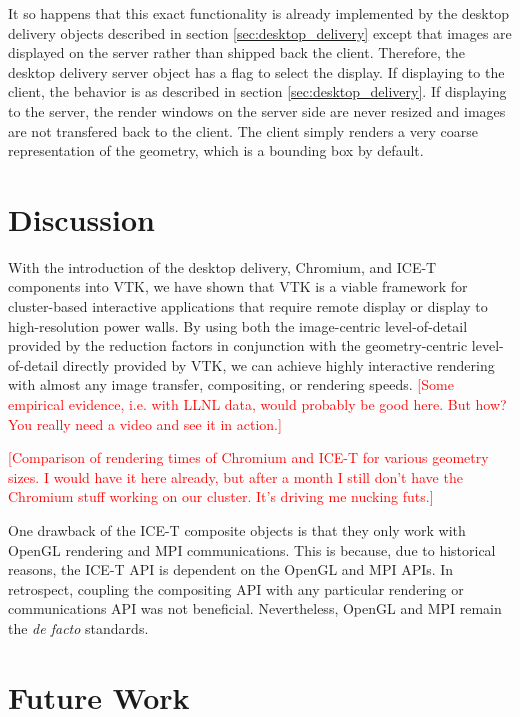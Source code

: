 \documentclass[twocolumn]{article}
\newcommand{\sticky}[1]{\textcolor{Red}{[#1]}}
\begin{document}
  It so happens that this exact functionality is already implemented by the
  desktop delivery objects described in section \ref{sec:desktop_delivery}
  except that images are displayed on the server rather than shipped back
  the client.  Therefore, the desktop delivery server object has a flag to
  select the display.  If displaying to the client, the behavior is as
  described in section \ref{sec:desktop_delivery}.  If displaying to the
  server, the render windows on the server side are never resized and
  images are not transfered back to the client.  The client simply renders
  a very coarse representation of the geometry, which is a bounding box by
  default.


  \section{Discussion}
  \label{sec:discussion}

  With the introduction of the desktop delivery, Chromium, and ICE-T
  components into VTK, we have shown that VTK is a viable framework for
  cluster-based interactive applications that require remote display or
  display to high-resolution power walls.  By using both the image-centric
  level-of-detail provided by the reduction factors in conjunction with the
  geometry-centric level-of-detail directly provided by VTK, we can achieve
  highly interactive rendering with almost any image transfer, compositing,
  or rendering speeds.  \sticky{Some empirical evidence, i.e. with LLNL
  data, would probably be good here.  But how?  You really need a video and
  see it in action.}

  \sticky{Comparison of rendering times of Chromium and ICE-T for various
  geometry sizes.  I would have it here already, but after a month I still
  don't have the Chromium stuff working on our cluster.  It's driving me
  nucking futs.}

  One drawback of the ICE-T composite objects is that they only work with
  OpenGL rendering and MPI communications.  This is because, due to
  historical reasons, the ICE-T API is dependent on the OpenGL and MPI
  APIs.  In retrospect, coupling the compositing API with any particular
  rendering or communications API was not beneficial.  Nevertheless, OpenGL
  and MPI remain the \emph{de facto} standards.


  \section{Future Work}
  \label{sec:future_work}
\end{document}
